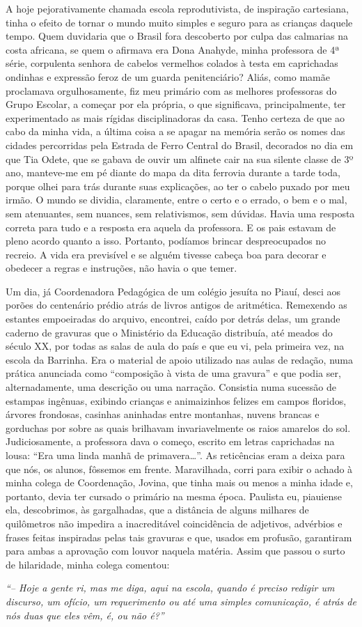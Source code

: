 A hoje pejorativamente chamada escola reprodutivista, de inspiração cartesiana, tinha o efeito de tornar o mundo muito simples e seguro para as crianças daquele tempo. 
Quem duvidaria que o Brasil fora descoberto por culpa das calmarias na costa africana, se quem o afirmava era Dona Anahyde, minha professora de 4ª série, corpulenta senhora de cabelos vermelhos colados à testa em caprichadas ondinhas e expressão feroz de um guarda penitenciário? 
Aliás, como mamãe proclamava orgulhosamente, fiz meu primário com as melhores professoras do Grupo Escolar, a começar por ela própria, o que significava, principalmente, ter experimentado as mais rígidas disciplinadoras da casa. 
Tenho certeza de que ao cabo da minha vida, a última coisa a se apagar na memória serão os nomes das cidades percorridas pela Estrada de Ferro Central do Brasil, decorados no dia em que Tia Odete, que se gabava de ouvir um alfinete cair na sua silente classe de 3º ano, manteve-me em pé diante do mapa da dita ferrovia durante a tarde toda, porque olhei para trás durante suas explicações, ao ter o cabelo puxado por meu irmão. 
O mundo se dividia, claramente, entre o certo e o errado, o bem e o mal, sem atenuantes, sem nuances, sem relativismos, sem dúvidas. 
Havia uma resposta correta para tudo e a resposta era aquela da professora. 
E os pais estavam de pleno acordo quanto a isso. 
Portanto, podíamos brincar despreocupados no recreio. A vida era previsível e se alguém tivesse cabeça boa para decorar e obedecer a regras e instruções, não havia o que temer. 

Um dia, já Coordenadora Pedagógica de um colégio jesuíta no Piauí, desci aos porões do centenário prédio atrás de livros antigos de aritmética. 
Remexendo as estantes empoeiradas do arquivo, encontrei, caído por detrás delas, um grande caderno de gravuras que o Ministério da Educação distribuía, até meados do século XX, por todas as salas de aula do país e que eu vi, pela primeira vez, na escola da Barrinha.  
Era o material de apoio utilizado nas aulas de redação, numa prática anunciada como ``composição à vista de uma gravura'' e que podia ser, alternadamente, uma descrição ou uma narração. 
Consistia numa sucessão de estampas ingênuas, exibindo crianças e animaizinhos felizes em campos floridos, árvores frondosas, casinhas aninhadas entre montanhas, nuvens brancas e gorduchas por sobre as quais brilhavam invariavelmente os raios amarelos do sol. 
Judiciosamente, a professora dava o começo, escrito em letras caprichadas na lousa: ``Era uma linda manhã de primavera\dots''. 
As reticências eram a deixa para que nós, os alunos, fôssemos em frente. 
Maravilhada, corri para exibir o achado à minha colega de Coordenação, Jovina, que tinha mais ou menos a minha idade e, portanto, devia ter cursado o primário na mesma época.  
Paulista eu, piauiense ela, descobrimos, às gargalhadas, que a distância de alguns milhares de quilômetros não impedira a inacreditável coincidência de adjetivos, advérbios e frases feitas inspiradas pelas tais gravuras e que, usados em profusão, garantiram para ambas a aprovação com louvor naquela matéria. Assim que passou o surto de hilaridade, minha colega comentou: 

{\itshape``-- Hoje a gente ri, mas me diga, aqui na escola, quando é preciso redigir um discurso, um ofício, um requerimento ou até uma simples comunicação, é atrás de nós duas que eles vêm, é, ou não é?''}